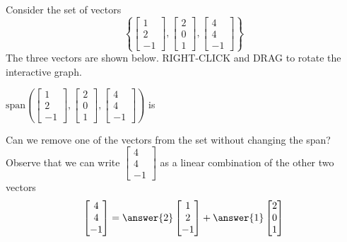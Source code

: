 \documentclass{ximera}
\begin{document}
\begin{exploration}\label{exp:redundantVecs2}
    Consider the set of vectors $$\left\{\begin{bmatrix}1\\2\\-1\end{bmatrix},\begin{bmatrix}2\\0\\1\end{bmatrix},\begin{bmatrix}4\\4\\-1\end{bmatrix}\right\}$$
The three vectors are shown below. RIGHT-CLICK and DRAG to rotate the interactive graph.
\begin{center}
\end{center}
$\mbox{span}\left(\begin{bmatrix}1\\2\\-1\end{bmatrix},\begin{bmatrix}2\\0\\1\end{bmatrix},\begin{bmatrix}4\\4\\-1\end{bmatrix}\right)$ is 

Can we remove one of the vectors from the set without changing the span?  Observe that we can write $\begin{bmatrix}4\\4\\-1\end{bmatrix}$ as a linear combination of the other two vectors
 \begin{equation}\label{eq:redundant}\begin{bmatrix}4\\4\\-1\end{bmatrix}=\answer{2}\begin{bmatrix}1\\2\\-1\end{bmatrix}+\answer{1}\begin{bmatrix}2\\0\\1\end{bmatrix}\end{equation}


\end{exploration}
\end{document}
